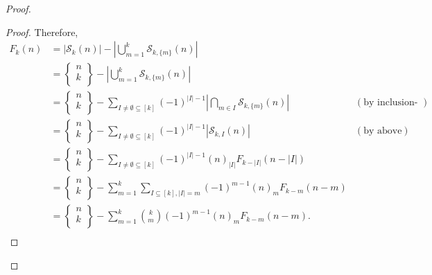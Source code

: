 \documentclass{article}
\begin{document}
\begin{enumerate}[label={\bf Q\arabic*:}]
\begin{proof}
\begin{proof}
        Therefore,
        \begin{align*}
          F_k(n) &=|\mathcal{S}_k(n)| -\left|\bigcup_{m=1}^k
            \mathcal{S}_{k,\{m\}}(n)\right|\\
          &=\begin{Bmatrix}n\\k\\\end{Bmatrix} -\left|\bigcup_{m=1}^k
            \mathcal{S}_{k,\{m\}}(n)\right|\\
          &=\begin{Bmatrix}n\\k\\\end{Bmatrix}
            -\sum_{I\neq\emptyset\subseteq[k]} (-1)^{|I|-1}
            \left|\bigcap_{m\in I} \mathcal{S}_{k,\{m\}}(n)\right|
            &(\text{by inclusion-exclusion})\\
          &=\begin{Bmatrix}n\\k\\\end{Bmatrix}
            -\sum_{I\neq\emptyset\subseteq[k]} (-1)^{|I|-1}
            \left|\mathcal{S}_{k,I}(n)\right| &(\text{by above})\\
          &=\begin{Bmatrix}n\\k\\\end{Bmatrix}
            -\sum_{I\neq\emptyset\subseteq[k]} (-1)^{|I|-1}
            (n)_{|I|} F_{k-|I|}(n-|I|)\\
          &=\begin{Bmatrix}n\\k\\\end{Bmatrix}
            -\sum_{m=1}^k \sum_{I\subseteq[k],|I|=m} (-1)^{m-1}
            (n)_{m} F_{k-m}(n-m)\\
          &=\begin{Bmatrix}n\\k\\\end{Bmatrix}
            -\sum_{m=1}^k \binom{k}{m} (-1)^{m-1}
            (n)_{m} F_{k-m}(n-m).\\
        \end{align*}
      \end{proof}
    \end{proof}
\end{enumerate}
\end{document}
